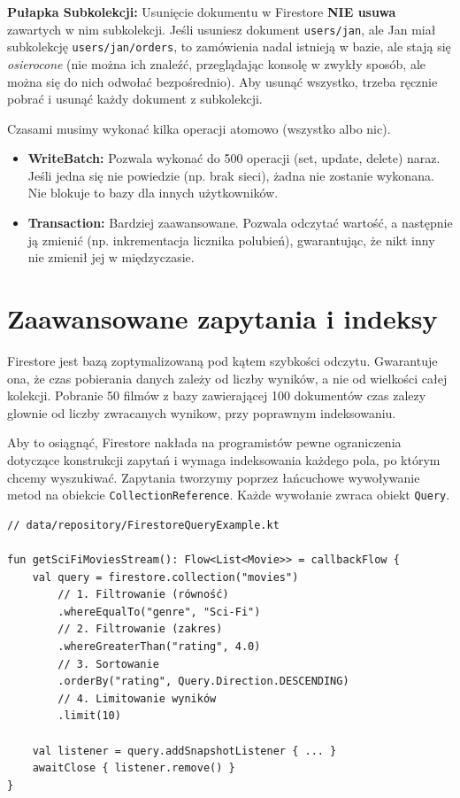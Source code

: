 \textbf{Pułapka Subkolekcji:} Usunięcie dokumentu w Firestore \textbf{NIE usuwa} zawartych w nim subkolekcji. 
Jeśli usuniesz dokument \texttt{users/jan}, ale Jan miał subkolekcję \texttt{users/jan/orders}, to zamówienia nadal istnieją w bazie, ale stają się \textit{osierocone} (nie można ich znaleźć, przeglądając konsolę w zwykły sposób, ale można się do nich odwołać bezpośrednio). Aby usunąć wszystko, trzeba ręcznie pobrać i usunąć każdy dokument z subkolekcji.

Czasami musimy wykonać kilka operacji atomowo (wszystko albo nic).
\begin{itemize}
    \item \textbf{WriteBatch:} Pozwala wykonać do 500 operacji (set, update, delete) naraz. Jeśli jedna się nie powiedzie (np. brak sieci), żadna nie zostanie wykonana. Nie blokuje to bazy dla innych użytkowników.
    \item \textbf{Transaction:} Bardziej zaawansowane. Pozwala odczytać wartość, a następnie ją zmienić (np. inkrementacja licznika polubień), gwarantując, że nikt inny nie zmienił jej w międzyczasie.
\end{itemize}

\section{Zaawansowane zapytania i indeksy}

Firestore jest bazą zoptymalizowaną pod kątem szybkości odczytu. Gwarantuje ona, że czas pobierania danych zależy od liczby wyników, a nie od wielkości całej kolekcji. Pobranie 50 filmów z bazy zawierającej 100 dokumentów czas zalezy glownie od liczby zwracanych wynikow, przy poprawnym indeksowaniu.

Aby to osiągnąć, Firestore nakłada na programistów pewne ograniczenia dotyczące konstrukcji zapytań i wymaga indeksowania każdego pola, po którym chcemy wyszukiwać. Zapytania tworzymy poprzez łańcuchowe wywoływanie metod na obiekcie \texttt{CollectionReference}. Każde wywołanie zwraca obiekt \texttt{Query}.

\begin{verbatim}
// data/repository/FirestoreQueryExample.kt

fun getSciFiMoviesStream(): Flow<List<Movie>> = callbackFlow {
    val query = firestore.collection("movies")
        // 1. Filtrowanie (równość)
        .whereEqualTo("genre", "Sci-Fi")
        // 2. Filtrowanie (zakres)
        .whereGreaterThan("rating", 4.0)
        // 3. Sortowanie
        .orderBy("rating", Query.Direction.DESCENDING)
        // 4. Limitowanie wyników
        .limit(10)

    val listener = query.addSnapshotListener { ... }
    awaitClose { listener.remove() }
}
\end{verbatim}

